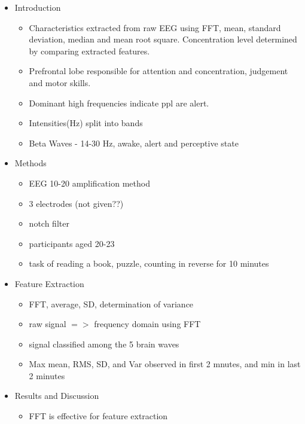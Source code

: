 \documentclass[a4paper]{article}
\begin{document}
\begin{itemize}
    \item Introduction
          \begin{itemize}
              \item Characteristics extracted from raw EEG using FFT, mean, standard deviation, median and mean root square. Concentration level determined by comparing extracted features.
              \item Prefrontal lobe responsible for attention and concentration, judgement and motor skills.
              \item Dominant high frequencies indicate ppl are alert.
              \item Intensities(Hz) split into bands
              \item Beta Waves - 14-30 Hz, awake, alert and perceptive state
          \end{itemize}
    \item Methods
          \begin{itemize}
              \item EEG 10-20 amplification method
              \item 3 electrodes (not given??)
              \item notch filter
              \item participants aged 20-23
              \item task of reading a book, puzzle, counting in reverse for 10 minutes
          \end{itemize}
    \item Feature Extraction
          \begin{itemize}
              \item FFT, average, SD, determination of variance
              \item raw signal $=>$ frequency domain using FFT
              \item signal classified among the 5 brain waves
              \item Max mean, RMS, SD, and Var observed in first 2 mnutes, and min in last 2 minutes
          \end{itemize}
    \item Results and Discussion
          \begin{itemize}
              \item FFT is effective for feature extraction
          \end{itemize}
\end{itemize}
\end{document}
